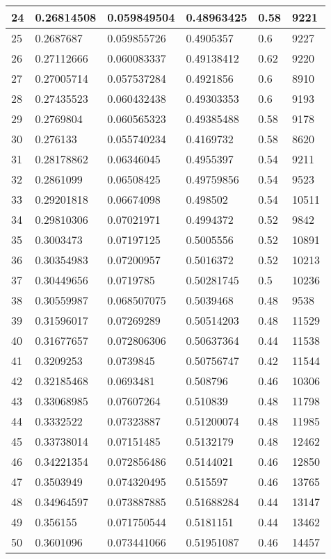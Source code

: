 \begin{longtable}{|l|l|l|l|l|l|}
24 & 0.26814508 & 0.059849504 & 0.48963425 & 0.58 & 9221 \\ \hline 
25 & 0.2687687 & 0.059855726 & 0.4905357 & 0.6 & 9227 \\ \hline 
26 & 0.27112666 & 0.060083337 & 0.49138412 & 0.62 & 9220 \\ \hline 
27 & 0.27005714 & 0.057537284 & 0.4921856 & 0.6 & 8910 \\ \hline 
28 & 0.27435523 & 0.060432438 & 0.49303353 & 0.6 & 9193 \\ \hline 
29 & 0.2769804 & 0.060565323 & 0.49385488 & 0.58 & 9178 \\ \hline 
30 & 0.276133 & 0.055740234 & 0.4169732 & 0.58 & 8620 \\ \hline 
31 & 0.28178862 & 0.06346045 & 0.4955397 & 0.54 & 9211 \\ \hline 
32 & 0.2861099 & 0.06508425 & 0.49759856 & 0.54 & 9523 \\ \hline 
33 & 0.29201818 & 0.06674098 & 0.498502 & 0.54 & 10511 \\ \hline 
34 & 0.29810306 & 0.07021971 & 0.4994372 & 0.52 & 9842 \\ \hline 
35 & 0.3003473 & 0.07197125 & 0.5005556 & 0.52 & 10891 \\ \hline 
36 & 0.30354983 & 0.07200957 & 0.5016372 & 0.52 & 10213 \\ \hline 
37 & 0.30449656 & 0.0719785 & 0.50281745 & 0.5 & 10236 \\ \hline 
38 & 0.30559987 & 0.068507075 & 0.5039468 & 0.48 & 9538 \\ \hline 
39 & 0.31596017 & 0.07269289 & 0.50514203 & 0.48 & 11529 \\ \hline 
40 & 0.31677657 & 0.072806306 & 0.50637364 & 0.44 & 11538 \\ \hline 
41 & 0.3209253 & 0.0739845 & 0.50756747 & 0.42 & 11544 \\ \hline 
42 & 0.32185468 & 0.0693481 & 0.508796 & 0.46 & 10306 \\ \hline 
43 & 0.33068985 & 0.07607264 & 0.510839 & 0.48 & 11798 \\ \hline 
44 & 0.3332522 & 0.07323887 & 0.51200074 & 0.48 & 11985 \\ \hline 
45 & 0.33738014 & 0.07151485 & 0.5132179 & 0.48 & 12462 \\ \hline 
46 & 0.34221354 & 0.072856486 & 0.5144021 & 0.46 & 12850 \\ \hline 
47 & 0.3503949 & 0.074320495 & 0.515597 & 0.46 & 13765 \\ \hline 
48 & 0.34964597 & 0.073887885 & 0.51688284 & 0.44 & 13147 \\ \hline 
49 & 0.356155 & 0.071750544 & 0.5181151 & 0.44 & 13462 \\ \hline 
50 & 0.3601096 & 0.073441066 & 0.51951087 & 0.46 & 14457 \\ \hline 
\end{longtable}